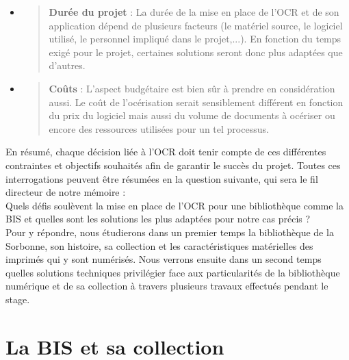 \documentclass[a4paper,12pt,twoside]{book}
\begin{document}
\begin{itemize}
	\item
	\begin{quote}
		\textbf{Durée du projet} : La durée de la mise en place de l'OCR et de
		son application dépend de plusieurs facteurs (le matériel source, le
		logiciel utilisé, le personnel impliqué dans le projet,...). En
		fonction du temps exigé pour le projet, certaines solutions seront
		donc plus adaptées que d'autres.
	\end{quote}
	\item
	\begin{quote}
		\textbf{Coûts} : L'aspect budgétaire est bien sûr à
		prendre en considération aussi. Le coût de l'océrisation serait
		sensiblement différent en fonction du prix du logiciel mais aussi du
		volume de documents à océriser ou encore des ressources utilisées pour un tel processus. \\
	\end{quote}
\end{itemize} 

En résumé, chaque décision liée à l'OCR doit tenir
compte de ces différentes contraintes et objectifs souhaités afin de
garantir le succès du projet. Toutes ces interrogations peuvent être
résumées en la question suivante, qui sera le fil directeur de notre
mémoire : \\

Quels défis soulèvent la mise en place de l'OCR pour une bibliothèque
comme la BIS et quelles sont les solutions les plus adaptées pour notre
cas précis ? \\

Pour y répondre, nous étudierons dans un premier temps la bibliothèque
de la Sorbonne, son histoire, sa collection et les caractéristiques
matérielles des imprimés qui y sont numérisés. Nous verrons ensuite dans
un second temps quelles solutions techniques privilégier face aux
particularités de la bibliothèque numérique et de sa collection à
travers plusieurs travaux effectués pendant le stage.

\newpage{\pagestyle{empty}\cleardoublepage}

	\mainmatter

	

	\chapter{La BIS et sa collection}
\end{document}
